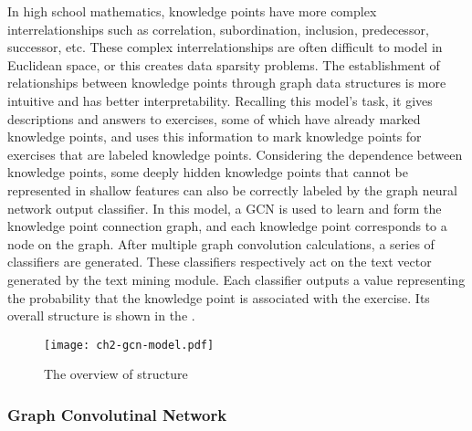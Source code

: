 
In high school mathematics, knowledge points have more complex interrelationships such as correlation, subordination, inclusion, predecessor, successor, etc. These complex interrelationships are often difficult to model in Euclidean space, or this creates data sparsity problems. The establishment of relationships between knowledge points through graph data structures is more intuitive and has better interpretability. Recalling this model's task, it gives descriptions and answers to exercises, some of which have already marked knowledge points, and uses this information to mark knowledge points for exercises that are labeled knowledge points. Considering the dependence between knowledge points, some deeply hidden knowledge points that cannot be represented in shallow features can also be correctly labeled by the graph neural network output classifier. In this model, a GCN is used to learn and form the knowledge point connection graph, and each knowledge point corresponds to a node on the graph. After multiple graph convolution calculations, a series of classifiers are generated. These classifiers respectively act on the text vector generated by the text mining module. Each classifier outputs a value representing the probability that the knowledge point is associated with the exercise. Its overall structure is shown in the \figname{\ref{fig:ch2-gcn-ov}}.

\begin{figure}[htbp!]
    \centering
    \texttt{[image: ch2-gcn-model.pdf]}
    \caption{The overview of structure}\label{fig:ch2-gcn-ov}
\end{figure}



\subsubsection{Graph Convolutinal Network}

